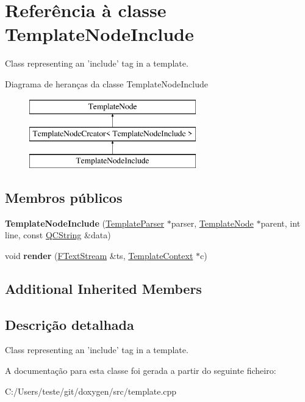 \hypertarget{class_template_node_include}{\section{Referência à classe Template\-Node\-Include}
\label{class_template_node_include}
}


Class representing an 'include' tag in a template.  


Diagrama de heranças da classe Template\-Node\-Include\begin{figure}[H]
\begin{center}
\leavevmode
\includegraphics[height=3.000000cm]{class_template_node_include}
\end{center}
\end{figure}
\subsection*{Membros públicos}
\begin{DoxyCompactItemize}
\item 
\hypertarget{class_template_node_include_a03ded7425ad5267e1e9ad339ec643dc5}{{\bfseries Template\-Node\-Include} (\hyperlink{class_template_parser}{Template\-Parser} $\ast$parser, \hyperlink{class_template_node}{Template\-Node} $\ast$parent, int line, const \hyperlink{class_q_c_string}{Q\-C\-String} \&data)}\label{class_template_node_include_a03ded7425ad5267e1e9ad339ec643dc5}

\item 
\hypertarget{class_template_node_include_aaa6575d8c79eeaa49f849f1ca1d6b228}{void {\bfseries render} (\hyperlink{class_f_text_stream}{F\-Text\-Stream} \&ts, \hyperlink{class_template_context}{Template\-Context} $\ast$c)}\label{class_template_node_include_aaa6575d8c79eeaa49f849f1ca1d6b228}

\end{DoxyCompactItemize}
\subsection*{Additional Inherited Members}


\subsection{Descrição detalhada}
Class representing an 'include' tag in a template. 

A documentação para esta classe foi gerada a partir do seguinte ficheiro\-:\begin{DoxyCompactItemize}
\item 
C\-:/\-Users/teste/git/doxygen/src/template.\-cpp\end{DoxyCompactItemize}
